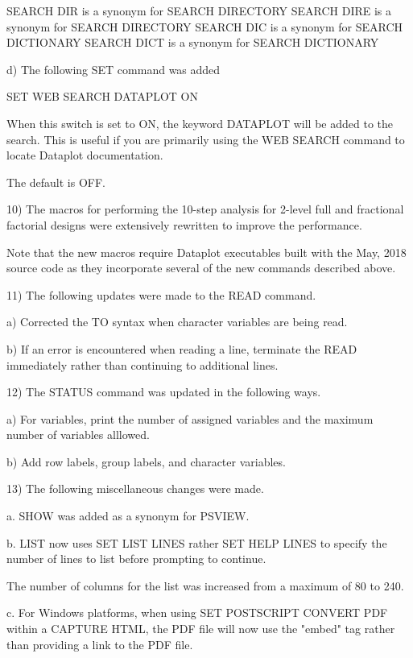           SEARCH DIR is a synonym for SEARCH DIRECTORY
          SEARCH DIRE is a synonym for SEARCH DIRECTORY
          SEARCH DIC is a synonym for SEARCH DICTIONARY
          SEARCH DICT is a synonym for SEARCH DICTIONARY

    d) The following SET command was added

          SET WEB SEARCH DATAPLOT ON

       When this switch is set to ON, the keyword DATAPLOT will be added
       to the search.  This is useful if you are primarily using the
       WEB SEARCH command to locate Dataplot documentation.

       The default is OFF.

10) The macros for performing the 10-step analysis for 2-level full and
    fractional factorial designs were extensively rewritten to improve
    the performance.

    Note that the new macros require Dataplot executables built with the
    May, 2018 source code as they incorporate several of the new
    commands described above.

11) The following updates were made to the READ command.

    a) Corrected the TO syntax when character variables are being
       read.

    b) If an error is encountered when reading a line, terminate the
       READ immediately rather than continuing to additional lines.

12) The STATUS command was updated in the following ways.

    a) For variables, print the number of assigned variables and the
       maximum number of variables alllowed.

    b) Add row labels, group labels, and character variables.

13) The following miscellaneous changes were made.

    a. SHOW was added as a synonym for PSVIEW.

    b. LIST now uses SET LIST LINES rather SET HELP LINES to specify the
       number of lines to list before prompting to continue.

       The number of columns for the list was increased from a maximum of
       80 to 240.

    c. For Windows platforms, when using SET POSTSCRIPT CONVERT PDF
       within a CAPTURE HTML, the PDF file will now use the "embed"
       tag rather than providing a link to the PDF file.

